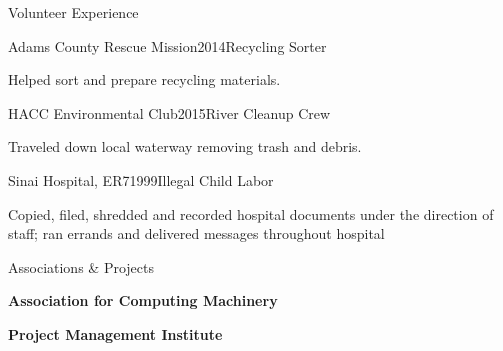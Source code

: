\documentclass{resume} %
\begin{document}
\begin{rSection}{Volunteer Experience}
\begin{rWorkSubsection}{Adams County Rescue Mission}{2014}{Recycling Sorter}{}
\item Helped sort and prepare recycling materials.
\end{rWorkSubsection}


\begin{rWorkSubsection}{HACC Environmental Club}{2015}{River Cleanup Crew}{}
\item Traveled down local waterway removing trash and debris.
\end{rWorkSubsection}


\begin{rWorkSubsection}{Sinai Hospital, ER7}{1999}{Illegal Child Labor}{}
\item Copied, filed, shredded and recorded hospital documents under the direction of staff; ran errands and delivered messages throughout hospital
\end{rWorkSubsection}

\end{rSection}


\begin{rSection}{Associations \& Projects} \itemsep -2pt


\item {\bf Association for Computing Machinery}
\item {\bf Project Management Institute}


\end{rSection}

\end{document}
